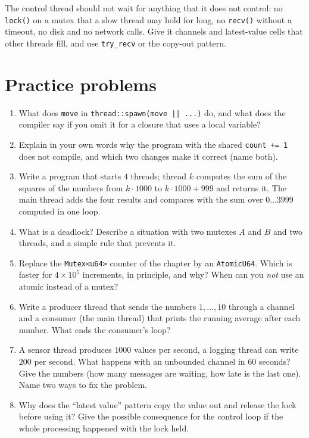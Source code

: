 \begin{aibox}
The control thread should not wait for anything that it does not control: no \verb!lock()! on a mutex that a slow thread may hold for long, no \verb!recv()! without a timeout, no disk and no network calls. Give it channels and latest-value cells that other threads fill, and use \verb!try_recv! or the copy-out pattern.
\end{aibox}

\section*{Practice problems}
\begin{enumerate}[label=\textbf{\thechapter.\arabic*}]
  \item What does \verb!move! in \verb!thread::spawn(move || ...)! do, and what does the compiler say if you omit it for a closure that uses a local variable?
  \item Explain in your own words why the program with the shared \verb!count += 1! does not compile, and which two changes make it correct (name both).
  \item Write a program that starts $4$ threads; thread $k$ computes the sum of the squares of the numbers from $k\cdot1000$ to $k\cdot1000+999$ and returns it. The main thread adds the four results and compares with the sum over $0\ldots3999$ computed in one loop.
  \item What is a deadlock? Describe a situation with two mutexes $A$ and $B$ and two threads, and a simple rule that prevents it.
  \item Replace the \verb!Mutex<u64>! counter of the chapter by an \verb!AtomicU64!. Which is faster for $4\times10^5$ increments, in principle, and why? When can you \emph{not} use an atomic instead of a mutex?
  \item Write a producer thread that sends the numbers $1,\dots,10$ through a channel and a consumer (the main thread) that prints the running average after each number. What ends the consumer's loop?
  \item A sensor thread produces $1000$ values per second, a logging thread can write $200$ per second. What happens with an unbounded channel in $60$ seconds? Give the numbers (how many messages are waiting, how late is the last one). Name two ways to fix the problem.
  \item Why does the ``latest value'' pattern copy the value out and release the lock before using it? Give the possible consequence for the control loop if the whole processing happened with the lock held.

\end{enumerate}
